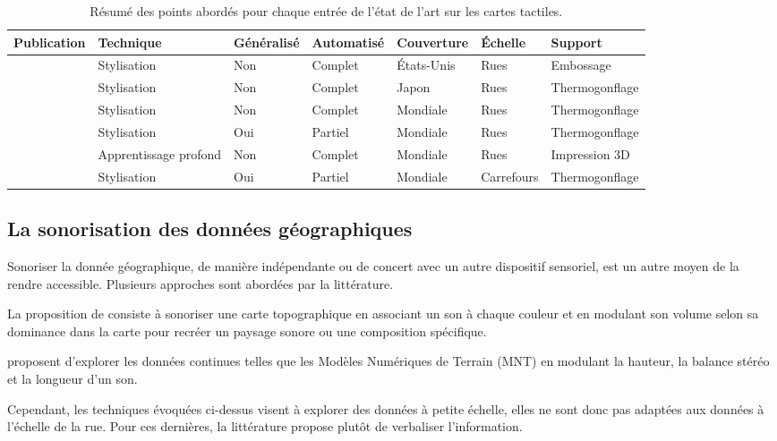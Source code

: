 \begin{table}
\begin{center}
\scriptsize
\begin{tabular}{ | l | l | l | l | l | l | l | }
    Publication & Technique & Généralisé & Automatisé & Couverture & Échelle & Support \tabularnewline
    \hline
    \cite{Miele2004} & Stylisation & Non & Complet & États-Unis & Rues & Embossage \tabularnewline
    \cite{Minatani2010} & Stylisation & Non & Complet & Japon & Rues & Thermogonflage \tabularnewline
    \cite{Watanabe2014, Cervenka2016} & Stylisation & Non & Complet & Mondiale & Rues & Thermogonflage \tabularnewline
    \cite{Stampach2016} & Stylisation & Oui & Partiel & Mondiale & Rues & Thermogonflage \tabularnewline
    \cite{FillieresRiveau2020} & Apprentissage profond & Non & Complet & Mondiale & Rues & Impression 3D \tabularnewline
    \cite{Jiang2023} & Stylisation & Oui & Partiel & Mondiale & Carrefours & Thermogonflage \tabularnewline
\end{tabular}
\end{center}
\caption{Résumé des points abordés pour chaque entrée de l'état de l'art sur les cartes tactiles.}
\label{tab:ea_relief}
\end{table}


\label{ea_cartetactile}

\subsection{La sonorisation des données géographiques}

Sonoriser la donnée géographique, de manière indépendante ou de concert avec un autre dispositif sensoriel, est un autre moyen de la rendre accessible. Plusieurs approches sont abordées par la littérature.


La proposition de \cite{Josselin2016} consiste à sonoriser une carte topographique en associant un son à chaque couleur et en modulant son volume selon sa dominance dans la carte pour recréer un paysage sonore ou une composition spécifique.

\cite{Schito2018} proposent d'explorer les données continues telles que les Modèles Numériques de Terrain (MNT) en modulant la hauteur, la balance stéréo et la longueur d'un son.

Cependant, les techniques évoquées ci-dessus visent à explorer des données à petite échelle, elles ne sont donc pas adaptées aux données à l'échelle de la rue. Pour ces dernières, la littérature propose plutôt de verbaliser l'information.

